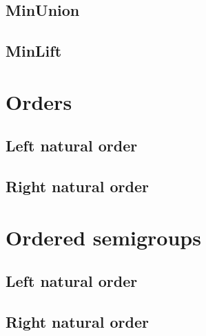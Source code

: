 \documentclass[10pt]{report}
\begin{document}
\subsection{MinUnion} 




\subsection{MinLift} 






\section{Orders}

\subsection{Left natural order}



\subsection{Right natural order}






\section{Ordered semigroups}

\subsection{Left natural order}




\subsection{Right natural order}


\end{document}
